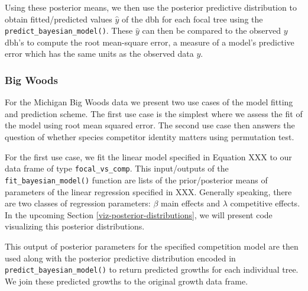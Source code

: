 \documentclass[12pt]{article}
\newenvironment{Shaded}{\begin{snugshade}}{\end{snugshade}}
\newcommand{\DataTypeTok}[1]{\textcolor[rgb]{0.13,0.29,0.53}{#1}}
\newcommand{\KeywordTok}[1]{\textcolor[rgb]{0.13,0.29,0.53}{\textbf{#1}}}
\newcommand{\NormalTok}[1]{#1}
\newcommand{\OperatorTok}[1]{\textcolor[rgb]{0.81,0.36,0.00}{\textbf{#1}}}
\newcommand{\OtherTok}[1]{\textcolor[rgb]{0.56,0.35,0.01}{#1}}
\newcommand{\StringTok}[1]{\textcolor[rgb]{0.31,0.60,0.02}{#1}}
\begin{document}
Using these posterior means, we then use the posterior predictive
distribution to obtain fitted/predicted values \(\widehat{y}\) of the
dbh for each focal tree using the \texttt{predict\_bayesian\_model()}.
These \(\widehat{y}\) can then be compared to the observed \(y\) dbh's
to compute the root mean-square error, a measure of a model's predictive
error which has the same units as the observed data \(y\).

\hypertarget{big-woods-4}{%
\subsubsection{Big Woods}\label{big-woods-4}}

For the Michigan Big Woods data we present two use cases of the model
fitting and prediction scheme. The first use case is the simplest where
we assess the fit of the model using root mean squared error. The second
use case then answers the question of whether species competitor
identity matters using permutation test.

For the first use case, we fit the linear model specified in Equation
XXX to our data frame of type \texttt{focal\_vs\_comp}. This
input/outputs of the \texttt{fit\_bayesian\_model()} function are lists
of the prior/posterior means of parameters of the linear regression
specified in XXX. Generally speaking, there are two classes of
regression parameters: \(\beta\) main effects and \(\lambda\)
competitive effects. In the upcoming Section
\ref{viz-posterior-distributions}, we will present code visualizing this
posterior distributions.

\begin{Shaded}
\end{Shaded}

This output of posterior parameters for the specified competition model
are then used along with the posterior predictive distribution encoded
in \texttt{predict\_bayesian\_model()} to return predicted growths for
each individual tree. We join these predicted growths to the original
growth data frame.

\begin{Shaded}
\end{Shaded}
\end{document}
